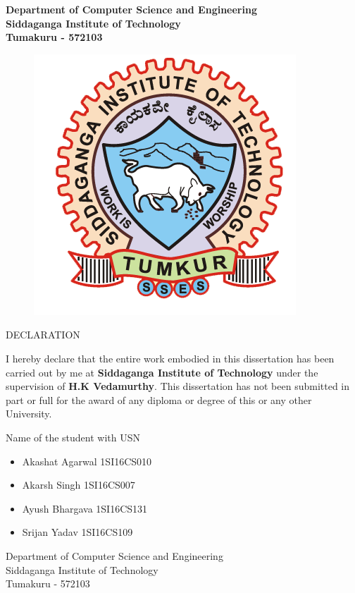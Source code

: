 \begin{center}
\bfseries
\large{Department of Computer Science and Engineering\\
Siddaganga Institute of Technology \\
Tumakuru - 572103} \\
\begin{figure}[hbtp]
\centering
\includegraphics[scale=1]{../ThesisFigs/College_logo.png}
\end{figure}
\LARGE{DECLARATION} \\
\end{center}
\vspace{0.5in}
\normalsize{
I hereby declare that the entire work embodied in this dissertation has been carried out by me at \textbf{Siddaganga Institute of Technology} under the supervision of \textbf{H.K Vedamurthy}. This dissertation has not been submitted in part or full for the award of any diploma or degree of this or any other University.} \\
\vspace{0.5in}
\begin{flushleft}
\normalsize{Name of the student with USN} \\
\begin{itemize}
		\item Akashat Agarwal 1SI16CS010
		\item Akarsh Singh 1SI16CS007
		\item Ayush Bhargava 1SI16CS131 
		\item Srijan Yadav 1SI16CS109
\end{itemize}
Department of Computer Science and Engineering\\
Siddaganga Institute of Technology\\
Tumakuru - 572103\\
\end{flushleft}


